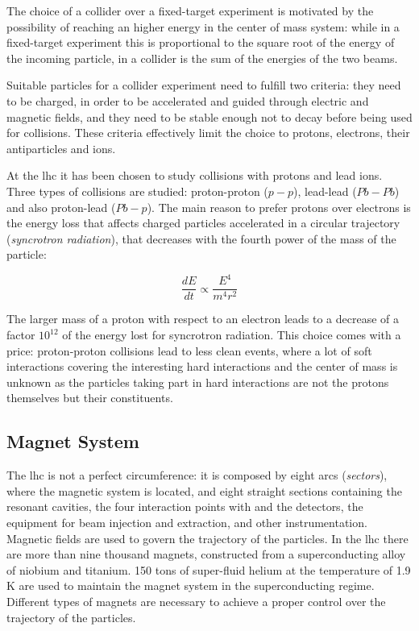 The choice of a collider over a fixed-target experiment is motivated by the possibility of reaching an higher energy in the center of mass system: while in a fixed-target experiment this is proportional to the square root of the energy of the incoming particle, in a collider is the sum of the energies of the two beams.


Suitable particles for a collider experiment need to fulfill two criteria: they need to be charged, in order to be accelerated and guided through electric and magnetic fields, and they need to be stable enough not to decay before being used for collisions. These criteria effectively limit the choice to protons, electrons, their antiparticles and ions. 

At the \gls{lhc} it has been chosen to study collisions with protons and lead ions. Three types of collisions are studied: proton-proton ($p-p$), lead-lead ($Pb-Pb$) and also proton-lead ($Pb-p$). The main reason to prefer protons over electrons is the energy loss that affects charged particles accelerated in a circular trajectory (\textit{syncrotron radiation}), that decreases with the fourth power of the mass of the particle:

\begin{equation}
\label{eq:cern:sync}
\frac{dE}{dt} \propto \frac{E^4}{m^4 r^2}
\end{equation}

The larger mass of a proton with respect to an electron leads to a decrease of a factor $10^{12}$ of the energy lost for syncrotron radiation. This choice comes with a price: proton-proton collisions lead to less clean events, where a lot of soft interactions covering the interesting hard interactions and the center of mass is unknown as the particles taking part in hard interactions are not the protons themselves but their constituents.

\subsection{Magnet System} 


The \gls{lhc} is not a perfect circumference: it is composed by eight arcs (\textit{sectors}), where the magnetic system is located, and eight straight sections containing the resonant cavities, the four interaction points with and the detectors, the equipment for beam injection and extraction, and other instrumentation. Magnetic fields are used to govern the trajectory of the particles. In the \gls{lhc} there are more than nine thousand magnets, constructed from a superconducting alloy of niobium and titanium. 150 tons of super-fluid helium at the temperature of 1.9 K are used to maintain the magnet system in the superconducting regime. Different types of magnets are necessary to achieve a proper control over the trajectory of the particles.

